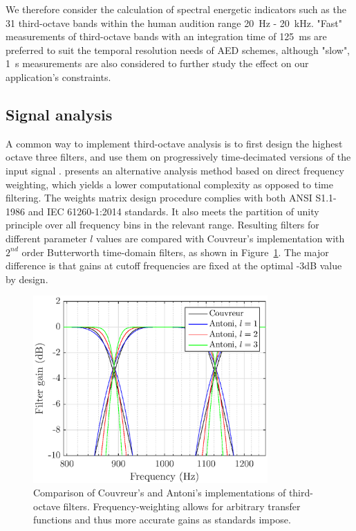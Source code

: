 \documentclass[sensors,article,submit,moreauthors,pdftex,10pt,a4paper]{mdpi}
\begin{document}
We therefore consider the calculation of spectral energetic indicators such as the 31 third-octave bands within the human audition range 20~Hz - 20~kHz. "Fast" measurements of third-octave bands with an integration time of 125~ms are preferred to suit the temporal resolution needs of AED schemes, although "slow", 1~s measurements are also considered to further study the effect on our application's constraints.

\subsection{Signal analysis}

A common way to implement third-octave analysis is to first design the highest octave three filters, and use them on progressively time-decimated versions of the input signal \cite{davis1986}. \cite{antoni2010} presents an alternative analysis method based on direct frequency weighting, which yields a lower computational complexity as opposed to time filtering. The weights matrix design procedure complies with both ANSI S1.1-1986 \cite{citeulike:9580295} and IEC 61260-1:2014 \cite{iec-norm} standards. It also meets the partition of unity principle over all frequency bins in the relevant range. Resulting filters for different parameter $l$ values are compared with Couvreur's implementation \cite{couvreur} with $2^{nd}$ order Butterworth time-domain filters, as shown in Figure~\ref{fig:freq_filt}. The major difference is that gains at cutoff frequencies are fixed at the optimal -3dB value by design.\\

\begin{figure}[htbp]
	\centering
		\includegraphics[width=0.8\textwidth]{figures/tob_imp.eps}
	\caption{Comparison of Couvreur's and Antoni's implementations of third-octave filters. Frequency-weighting allows for arbitrary transfer functions and thus more accurate gains as standards impose.}
	\label{fig:freq_filt}
\end{figure}
\end{document}
